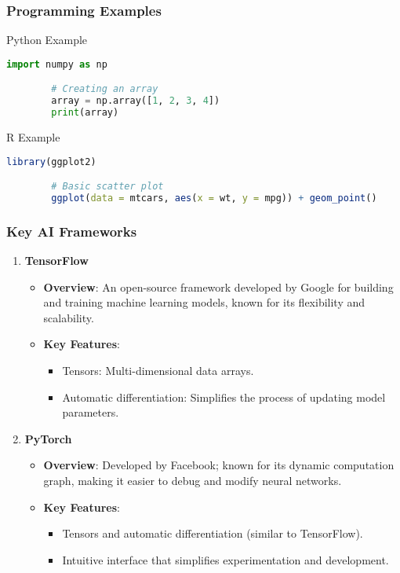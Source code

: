 \documentclass{beamer}
\begin{document}
\begin{frame}[fragile]
    \frametitle{Programming Examples}
    \begin{block}{Python Example}
        \begin{lstlisting}[language=Python]
        import numpy as np

        # Creating an array
        array = np.array([1, 2, 3, 4])
        print(array)
        \end{lstlisting}
    \end{block}

    \begin{block}{R Example}
        \begin{lstlisting}[language=R]
        library(ggplot2)

        # Basic scatter plot
        ggplot(data = mtcars, aes(x = wt, y = mpg)) + geom_point()
        \end{lstlisting}
    \end{block}
\end{frame}

\begin{frame}
    \frametitle{Key AI Frameworks}
    \begin{enumerate}
        \item \textbf{TensorFlow}
        \begin{itemize}
            \item \textbf{Overview}: An open-source framework developed by Google for building and training machine learning models, known for its flexibility and scalability.
            \item \textbf{Key Features}:
            \begin{itemize}
                \item Tensors: Multi-dimensional data arrays.
                \item Automatic differentiation: Simplifies the process of updating model parameters.
            \end{itemize}
        \end{itemize}

        \item \textbf{PyTorch}
        \begin{itemize}
            \item \textbf{Overview}: Developed by Facebook; known for its dynamic computation graph, making it easier to debug and modify neural networks.
            \item \textbf{Key Features}:
            \begin{itemize}
                \item Tensors and automatic differentiation (similar to TensorFlow).
                \item Intuitive interface that simplifies experimentation and development.
            \end{itemize}
        \end{itemize}
    \end{enumerate}
\end{frame}
\end{document}
